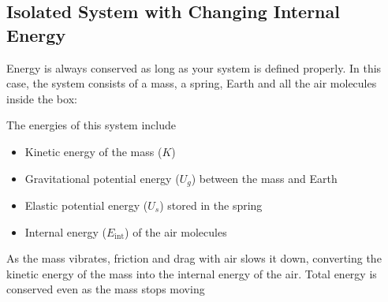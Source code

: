 \documentclass[11pt]{article}
\begin{document}
\begin{figure}[ht]
  \centering
\end{figure}



\subsection{Isolated System with Changing Internal Energy}

Energy is always conserved as long as your system is defined properly. In
this case, the system consists of a mass, a spring, Earth and all the air
molecules inside the box:
\begin{figure}[ht]
  \centering
\end{figure}
The energies of this system include
\begin{itemize}
\item Kinetic energy of the mass ($K$)
\item Gravitational potential energy ($U_g$) between the mass and Earth
\item Elastic potential energy ($U_s$) stored in the spring
  \item Internal energy ($E_\text{int}$) of the air molecules
\end{itemize}

As the mass vibrates, friction and drag with air slows it down, converting the
kinetic energy of the mass into the internal energy of the air. Total energy
is conserved even as the mass stops moving
\end{document}
